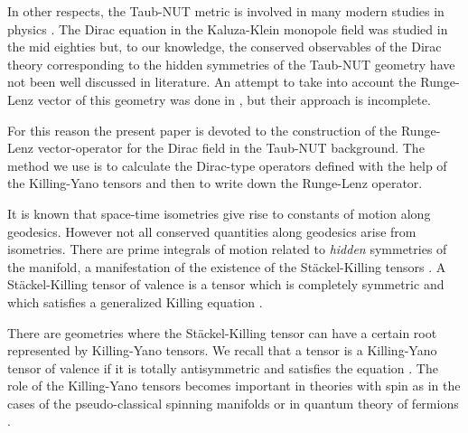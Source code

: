 \documentclass[a4paper,12pt]{article}
\begin{document}
In other respects, the Taub-NUT metric is involved in many modern studies in 
physics \cite{GM,GRFH,MAH}. The Dirac equation in the Kaluza-Klein monopole 
field was studied in the mid eighties \cite{DIRAC} but, to our knowledge,  
the conserved observables of the Dirac theory corresponding to the hidden 
symmetries of the Taub-NUT geometry have not been well discussed in  
literature. An attempt to take into account the Runge-Lenz vector of this 
geometry was done in \cite{CH}, but their approach is incomplete. 

For this reason the present paper is devoted to the construction of the 
Runge-Lenz vector-operator for the  Dirac field in the 
Taub-NUT background. The method we use is to calculate the Dirac-type 
operators defined with the help of the  Killing-Yano tensors and then to 
write down the Runge-Lenz operator.    

It is known that space-time isometries give rise to constants of motion 
along geodesics. However not all conserved quantities along geodesics 
arise from isometries. There are prime integrals of motion  related to 
{\em hidden} symmetries of the manifold, a manifestation of the existence 
of the St\" ackel-Killing tensors \cite{Ca1,CRGH}.
A St\" ackel-Killing tensor of valence \coordHE{} is a tensor \coordHE{}  
which is completely symmetric and which satisfies a generalized Killing 
equation \coordHE{}. 

There are geometries where the St\" ackel-Killing tensor can have a certain 
root represented by Killing-Yano tensors. We recall that a tensor 
\coordHE{} is a Killing-Yano tensor of valence \coordHE{}  if it is totally 
antisymmetric and  satisfies the equation 
\coordHE{} \cite{Ya}.
The role of the Killing-Yano tensors becomes important in theories with spin
as in the cases of the pseudo-classical  spinning manifolds \cite{BM,GRH} 
or in quantum theory of fermions \cite{CV2}. 
\end{document}
